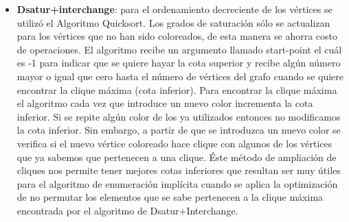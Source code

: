 \documentclass[a4paper,10pt]{article}
\begin{document}
\begin{itemize}
 \item \textbf{Dsatur+interchange}: para el ordenamiento decreciente de los vértices se utilizó el Algoritmo Quicksort. Los 
grados de saturación sólo se actualizan para los vértices que no han sido coloreados, de esta manera se ahorra costo 
de operaciones. El algoritmo recibe un argumento llamado start-point el cuál es -1 para indicar que se quiere hayar 
la cota superior y recibe algún número mayor o igual que cero hasta el número de vértices del grafo cuando se quiere encontrar 
la clique máxima (cota inferior).
Para encontrar la clique máxima el algoritmo cada vez que introduce un nuevo color incrementa la cota inferior. Si se repite algún color de los ya utilizados entonces no modificamos la cota inferior. Sin embargo, a partir de que se introduzca un nuevo color se verifica si el nuevo vértice coloreado hace clique con algunos de los vértices que ya 
sabemos que pertenecen a una clique. Éste método de ampliación de cliques nos permite tener mejores cotas inferiores que 
resultan ser muy útiles para el algoritmo de enumeración implícita cuando se aplica la optimización de no permutar 
los elementos que se sabe pertenecen a la clique máxima encontrada por el algoritmo de Dsatur+Interchange.



\end{itemize}
\end{document}
